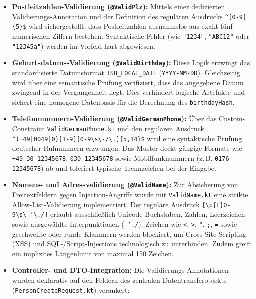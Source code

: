 \begin{itemize}
    \item \textbf{Postleitzahlen-Validierung (\texttt{@ValidPlz}):} Mittels einer dedizierten Validierungs-Annotation und der Definition des 
    regulären Ausdrucks \texttt{\^{}[0-9]\{5\}\$} wird sichergestellt, dass Postleitzahlen ausnahmslos aus exakt fünf numerischen Ziffern bestehen. 
    Syntaktische Fehler (wie \texttt{"1234"}, \texttt{"ABC12"} oder \texttt{"12345a"}) werden im Vorfeld hart abgewiesen.
    \item \textbf{Geburtsdatums-Validierung (\texttt{@ValidBirthday}):} Diese Logik erzwingt das standardisierte Datumsformat \texttt{ISO\_LOCAL\_DATE} 
    (\texttt{YYYY-MM-DD}). Gleichzeitig wird über eine semantische Prüfung verifiziert, dass das angegebene Datum zwingend in der Vergangenheit liegt. 
    Dies verhindert logische Artefakte und sichert eine homogene Datenbasis für die Berechnung des \texttt{birthdayHash}.
    \item \textbf{Telefonnummern-Validierung (\texttt{@ValidGermanPhone}):} Über das Custom-Constraint \texttt{ValidGermanPhone.kt} und den regulären Ausdruck \\
    \texttt{\^{}(+49|0049|0)[1-9][0-9\textbackslash s\textbackslash-/\textbackslash.]\{5,14\}\$} wird eine syntaktische Prüfung deutscher Rufnummern erzwungen. 
    Das Muster deckt gängige Formate wie \texttt{+49 30 12345678}, \texttt{030 12345678} sowie Mobilfunknummern (z.\,B. \texttt{0176 12345678}) ab und toleriert 
    typische Trennzeichen bei der Eingabe.
    \item \textbf{Namens- und Adressvalidierung (\texttt{@ValidName}):} Zur Absicherung von Freitextfeldern gegen Injection-Angriffe wurde mit \texttt{ValidName.kt} 
    eine strikte Allow-List-Validierung implementiert. Der reguläre Ausdruck \texttt{[\textbackslash p\{L\}0-9\textbackslash s\textbackslash-'\textbackslash./]} 
    erlaubt ausschließlich Unicode-Buchstaben, Zahlen, Leerzeichen sowie ausgewählte Interpunktionen (\texttt{-'\thinspace./}). Zeichen wie \texttt{<}, \texttt{>}, 
    \texttt{"}, \texttt{;}, \texttt{=} sowie geschweifte oder runde Klammern werden blockiert, um Cross-Site Scripting (XSS) und SQL-/Script-Injections technologisch 
    zu unterbinden. Zudem greift ein implizites Längenlimit von maximal 150 Zeichen.
    \item \textbf{Controller- und DTO-Integration:} Die Validierungs-Annotationen wurden deklarativ auf den Feldern des zentralen Datentransferobjekts 
    (\texttt{PersonCreateRequest.kt}) verankert:

\end{itemize}
